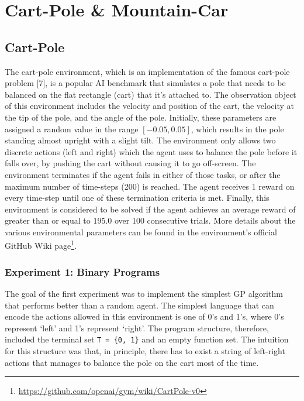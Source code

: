 \chapter{Cart-Pole \& Mountain-Car}
\section{Cart-Pole}
The cart-pole environment, which is an implementation of the famous cart-pole problem [7], is a popular AI benchmark that simulates a pole that needs to be balanced on the flat rectangle (cart) that it's attached to. The observation object of this environment includes the velocity and position of the cart, the velocity at the tip of the pole, and the angle of the pole. Initially, these parameters are assigned a random value in the range $[-0.05, 0.05]$, which results in the pole standing almost upright with a slight tilt. The environment only allows two discrete actions (left and right) which the agent uses to balance the pole before it falls over, by pushing the cart without causing it to go off-screen. The environment terminates if the agent fails in either of those tasks, or after the maximum number of time-steps (200) is reached. The agent receives $1$ reward on every time-step until one of these termination criteria is met. Finally, this environment is considered to be solved if the agent achieves an average reward of greater than or equal to $195.0$ over 100 consecutive trials. More details about the various environmental parameters can be found in the environment’s official GitHub Wiki page\footnote{\url{https://github.com/openai/gym/wiki/CartPole-v0}}.

\subsection{Experiment 1: Binary Programs}
The goal of the first experiment was to implement the simplest GP algorithm that performs better than a random agent. The simplest language that can encode the actions allowed in this environment is one of 0’s and 1’s, where 0’s represent ‘left’ and 1’s represent ‘right’. The program structure, therefore, included the terminal set \verb+T = {0, 1}+ and an empty function set. The intuition for this structure was that, in principle, there has to exist a string of left-right actions that manages to balance the pole on the cart most of the time. 


